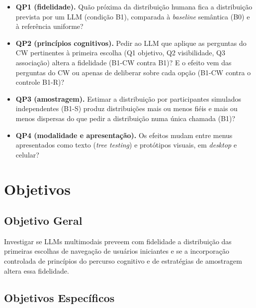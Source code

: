 \documentclass[12pt,oneside,a4paper,chapter=TITLE,english,brazil]{abntex2}
\begin{document}
\begin{itemize}
\item \textbf{QP1 (fidelidade).} Quão próxima da distribuição humana fica a distribuição prevista por um LLM (condição B1), comparada à \textit{baseline} semântica (B0) e à referência uniforme?
\item \textbf{QP2 (princípios cognitivos).} Pedir ao LLM que aplique as perguntas do CW pertinentes à primeira escolha (Q1 objetivo, Q2 visibilidade, Q3 associação) altera a fidelidade (B1-CW contra B1)? E o efeito vem das perguntas do CW ou apenas de deliberar sobre cada opção (B1-CW contra o controle B1-R)?
\item \textbf{QP3 (amostragem).} Estimar a distribuição por participantes simulados independentes (B1-S) produz distribuições mais ou menos fiéis e mais ou menos dispersas do que pedir a distribuição numa única chamada (B1)?
\item \textbf{QP4 (modalidade e apresentação).} Os efeitos mudam entre menus apresentados como texto (\textit{tree testing}) e protótipos visuais, em \textit{desktop} e celular?
\end{itemize}

\section{Objetivos}
\label{sec:objetivos}

\subsection{Objetivo Geral}

Investigar se LLMs multimodais preveem com fidelidade a distribuição das primeiras escolhas de navegação de usuários iniciantes e se a incorporação controlada de princípios do percurso cognitivo e de estratégias de amostragem altera essa fidelidade.

\subsection{Objetivos Específicos}
\end{document}
